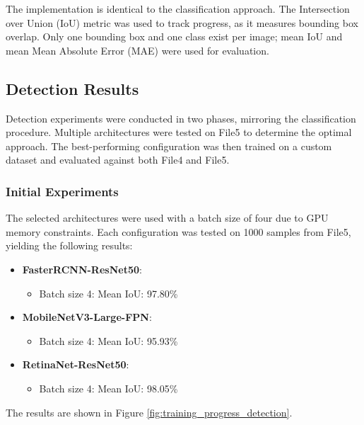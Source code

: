 \documentclass[conference]{IEEEtran}
\begin{document}
The implementation is identical to the classification approach. The Intersection over Union (IoU) metric was used to track progress, as
it measures bounding box overlap. Only one bounding box and one class exist per image; mean IoU and mean Mean Absolute Error (MAE) were
used for evaluation.

\subsection{Detection Results}

Detection experiments were conducted in two phases, mirroring the classification procedure. Multiple architectures were tested on File5
to determine the optimal approach. The best-performing configuration was then trained on a custom dataset and evaluated against both File4 and File5.

\subsubsection{Initial Experiments}

The selected architectures were used with a batch size of four due to GPU memory constraints. Each configuration was tested on 1000 samples
from File5, yielding the following results:

\begin{itemize}
  \item \textbf{FasterRCNN-ResNet50}:
    \begin{itemize}
        \item Batch size 4: Mean IoU: 97.80\%
    \end{itemize}
    
  \item \textbf{MobileNetV3-Large-FPN}:
    \begin{itemize}
        \item Batch size 4: Mean IoU: 95.93\% 
    \end{itemize}

  \item \textbf{RetinaNet-ResNet50}:
    \begin{itemize}
        \item Batch size 4: Mean IoU: 98.05\%
    \end{itemize}
\end{itemize}

The results are shown in Figure \ref{fig:training_progress_detection}.
\end{document}
